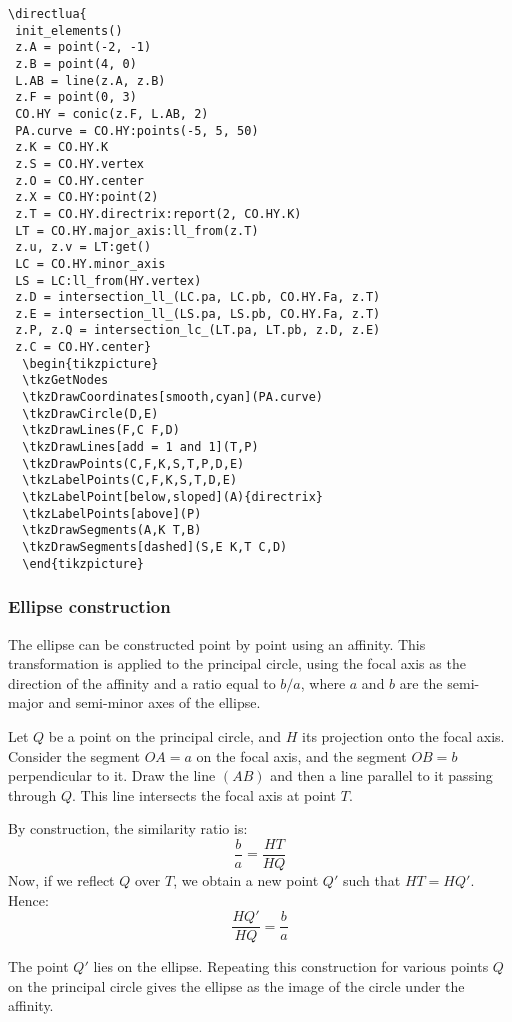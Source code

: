 \begin{verbatim}
\directlua{
 init_elements()
 z.A = point(-2, -1)
 z.B = point(4, 0)
 L.AB = line(z.A, z.B)
 z.F = point(0, 3)
 CO.HY = conic(z.F, L.AB, 2)
 PA.curve = CO.HY:points(-5, 5, 50)
 z.K = CO.HY.K
 z.S = CO.HY.vertex
 z.O = CO.HY.center
 z.X = CO.HY:point(2)
 z.T = CO.HY.directrix:report(2, CO.HY.K)
 LT = CO.HY.major_axis:ll_from(z.T)
 z.u, z.v = LT:get()
 LC = CO.HY.minor_axis
 LS = LC:ll_from(HY.vertex)
 z.D = intersection_ll_(LC.pa, LC.pb, CO.HY.Fa, z.T)
 z.E = intersection_ll_(LS.pa, LS.pb, CO.HY.Fa, z.T)
 z.P, z.Q = intersection_lc_(LT.pa, LT.pb, z.D, z.E)
 z.C = CO.HY.center}
  \begin{tikzpicture}
  \tkzGetNodes
  \tkzDrawCoordinates[smooth,cyan](PA.curve)
  \tkzDrawCircle(D,E)
  \tkzDrawLines(F,C F,D)
  \tkzDrawLines[add = 1 and 1](T,P)
  \tkzDrawPoints(C,F,K,S,T,P,D,E)
  \tkzLabelPoints(C,F,K,S,T,D,E)
  \tkzLabelPoint[below,sloped](A){directrix}
  \tkzLabelPoints[above](P)
  \tkzDrawSegments(A,K T,B)
  \tkzDrawSegments[dashed](S,E K,T C,D)
  \end{tikzpicture}
  \end{verbatim}

\subsubsection{Ellipse construction}

The ellipse can be constructed point by point using an affinity. This transformation is applied to the principal circle, using the focal axis as the direction of the affinity and a ratio equal to $b/a$, where $a$ and $b$ are the semi-major and semi-minor axes of the ellipse.

Let $Q$ be a point on the principal circle, and $H$ its projection onto the focal axis. Consider the segment $OA = a$ on the focal axis, and the segment $OB = b$ perpendicular to it. Draw the line $(AB)$ and then a line parallel to it passing through $Q$. This line intersects the focal axis at point $T$.

By construction, the similarity ratio is:
\[
\frac{b}{a} = \frac{HT}{HQ}
\]
Now, if we reflect $Q$ over $T$, we obtain a new point $Q'$ such that $HT = HQ'$. Hence:
\[
\frac{HQ'}{HQ} = \frac{b}{a}
\]

The point $Q'$ lies on the ellipse. Repeating this construction for various points $Q$ on the principal circle gives the ellipse as the image of the circle under the affinity.

